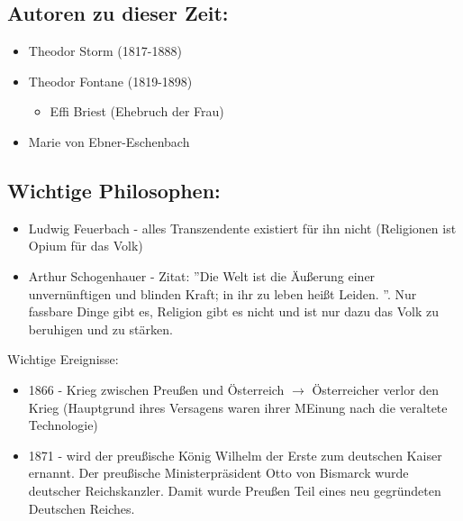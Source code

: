 \documentclass[12pt,a4paper]{article}
\begin{document}
\subsection{Autoren zu dieser Zeit:}
\begin{itemize}
\item Theodor Storm (1817-1888)
\item Theodor Fontane (1819-1898)
	\begin{itemize}
	\item Effi Briest (Ehebruch der Frau)
	\end{itemize}
\item Marie von Ebner-Eschenbach
\end{itemize}

\subsection{Wichtige Philosophen:}
\begin{itemize}
\item Ludwig Feuerbach - alles Transzendente existiert für ihn nicht (Religionen ist Opium für das Volk)
\item Arthur Schogenhauer - Zitat: ''Die Welt ist die Äußerung einer unvernünftigen und blinden Kraft; in ihr zu leben heißt Leiden. ''. Nur fassbare Dinge gibt es, Religion gibt es nicht und ist nur dazu das Volk zu beruhigen und zu stärken.
\end{itemize}	

Wichtige Ereignisse:

\begin{itemize}
\item 1866 - Krieg zwischen Preußen und Österreich $\rightarrow$ Österreicher verlor den Krieg (Hauptgrund ihres Versagens waren ihrer MEinung nach die veraltete Technologie)
\item 1871 - wird der preußische König Wilhelm der Erste zum deutschen Kaiser ernannt. Der preußische Ministerpräsident Otto von Bismarck wurde deutscher Reichskanzler. Damit wurde Preußen Teil eines neu gegründeten Deutschen Reiches.
\end{itemize}
	
\end{document}
